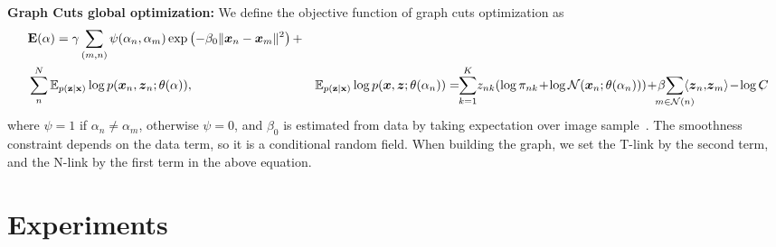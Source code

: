 \documentclass{article}
\renewcommand{\vec}[1]{\boldsymbol{#1}}
\newcommand{\mat}[1]{\text{\bf #1}}
\begin{document}
\noindent \textbf{Graph Cuts global optimization: }We define the objective
function of graph cuts optimization as
\begin{align*}
  &\mat E(\alpha) = \gamma \sum_{(m,n)} \psi(\alpha_n, \alpha_m) \exp \left ( -\beta_0 \| \vec x_n - \vec x_m\|^2 \right ) +\\
  & \sum_n^N \mathbb{E}_{p(\mat z|\mat x)} \log p(\vec x_n, \vec z_n; \theta (\alpha)),
  &\mathbb{E}_{p(\mat z|\mat x)} \log p(\vec x, \vec z; \theta (\alpha_n)) = \!\!\sum_{k=1}^K \!z_{nk}(\log \pi_{nk} \!+\! \log \mathcal{N}(\vec x_n; \theta(\alpha_n))) \!+\!  \beta \!\!\!\!\!\!\sum_{m \in \mathcal{N}(n)} \!\!\!\!\!\langle \vec z_n, \!\vec z_m\rangle \!-\! \log C \!\!\!\!,
\end{align*}
where $\psi = 1$ if $\alpha_n \neq \alpha_m$, otherwise $\psi = 0$, and
$\beta_0$ is estimated from data by taking expectation over image
sample~\cite{boykov2001fast,rother2004grabcut}. The smoothness constraint
depends on the data term, so it is a conditional random field. When building the
graph, we set the T-link by the second term, and the N-link by the first term in
the above equation.



\section{Experiments}
\end{document}
